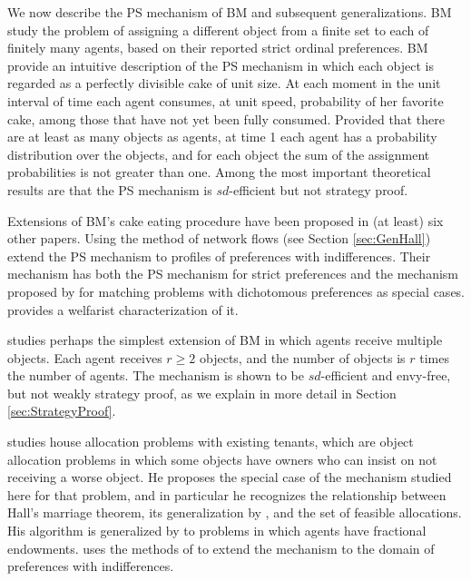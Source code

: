 \documentclass[12pt, A4paper]{article}
\theoremstyle{definition}
\begin{document}
We now describe the PS mechanism of BM and subsequent generalizations.  BM study the problem of assigning a different object from a finite set to each of finitely many agents, based on their reported strict ordinal preferences.
BM provide an intuitive description of the PS mechanism in which each object is regarded as a perfectly divisible cake of unit size.  At each moment in the unit interval of time each agent consumes, at unit speed, probability of her favorite cake, among those that have not yet been fully consumed.  Provided that there are at least as many objects as agents, at time 1 each agent has a probability distribution over the objects, and for each object the sum of the assignment probabilities is not greater than one.    Among the most important theoretical results are that the PS mechanism is $sd$-efficient but not strategy proof. 

Extensions of BM's cake eating procedure have been proposed in (at least) six other papers.  Using the method of network flows (see Section \ref{sec:GenHall}) \cite{KaSe06} extend the PS mechanism to profiles of preferences with indifferences.  Their mechanism has both the PS mechanism for strict preferences and the mechanism proposed by \cite{bm04} for matching problems with dichotomous preferences as special cases. \cite{bog15} provides a welfarist characterization of it.

\cite{kojima09mss} studies perhaps the simplest extension of BM in which agents receive multiple objects.  Each agent receives $r \ge 2$ objects, and the number of objects is $r$ times the number of agents.  The mechanism is shown to be $sd$-efficient and envy-free, but not weakly strategy proof, as we explain in more detail in Section \ref{sec:StrategyProof}.

\cite{yilmaz10geb} studies house allocation problems with existing tenants, which are object allocation problems in which some objects have owners who can insist on not receiving a worse object.  He proposes the special case of the mechanism studied here for that problem, and in particular he recognizes the relationship between Hall's marriage theorem, its generalization by \cite{Gal57}, and the set of feasible allocations.  His algorithm is generalized by \cite{AtSe11} to problems in which agents have fractional endowments.  \cite{yilmaz09geb} uses the methods of \cite{KaSe06} to extend the mechanism to the domain of preferences with indifferences.
\end{document}
